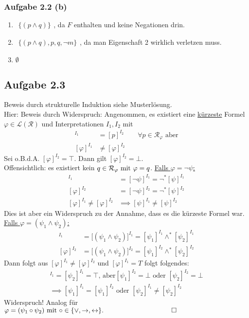 \subsubsection{Aufgabe 2.2 (b)}
\begin{enumerate}[label=(\arabic*)]
	\item $\begin{aligned}\big\lbrace
		(p\wedge q)
	\big\rbrace\end{aligned}$, da $F$ enthalten und keine Negationen drin.
	\item $\begin{aligned}\big\lbrace
		(p\wedge q), p, q, \neg m
	\big\rbrace\end{aligned}$, da man Eigenschaft 2 wirklich verletzen muss.
	\item $\emptyset$
\end{enumerate}

\subsection{Aufgabe 2.3}
Beweis durch strukturelle Induktion siehe Musterlösung.\\
Hier: Beweis durch Widerspruch: Angenommen, es existiert eine \underline{kürzeste} Formel 
$\varphi\in\mathcal{L}(\mathcal{R})$ und Interpretationen $I_1,I_2$ mit 
\begin{align*}
	[p]^{I_1}&=[p]^{I_2}\qquad\forall p\in\mathcal{R}_\varphi\text{ aber}\\
	[\varphi]^{I_1}&\neq[\varphi]^{I_2}
\end{align*}
Sei o.B.d.A. $[\varphi]^{I_2}=\top$. 
Dann gilt $[\varphi]^{I_2}=\bot$.\\
Offensichtlich: es existiert kein $q\in\mathcal{R}_\varphi\mit\varphi=q$.\nl
\underline{Falls $\varphi=\neg\psi$:}
\begin{align*}
	[\varphi]^{I_1}&=[\neg\psi]^{I_1}=\neg^\ast[\psi]^{I_1}\\
	[\varphi]^{I_2}&=[\neg\psi]^{I_2}=\neg^\ast[\psi]^{I_2}\\
	[\varphi]^{I_1}\neq[\varphi]^{I_2}&\implies[\psi]^{I_1}\neq[\psi]^{I_2}
\end{align*}
Dies ist aber ein Widerspruch zu der Annahme, dass es die kürzeste Formel war.\nl
\underline{Falls $\varphi=(\psi_1\wedge\psi_2)$:}
\begin{align*}
	[\varphi]^{I_1}&=\big[(\psi_1\wedge\psi_2)\big]^{I_1}=[\psi_1]^{I_1}\wedge^\ast[\psi_2]^{I_1}\\
	[\varphi]^{I_2}&=\big[(\psi_1\wedge\psi_2)\big]^{I_2}=[\psi_1]^{I_2}\wedge^\ast[\psi_2]^{I_2}
\end{align*}
Dann folgt aus $[\varphi]^{I_1}\neq[\varphi]^{I_2}$ und $[\varphi]^{I_1}=T$ folgt folgendes:
\begin{align*}
	[\psi_1]^{I_1}=[\psi_2]^{I_1}=\top\text{, aber} [\psi_1]^{I_2}=\bot\text{ oder }[\psi_2]^{I_2}=\bot\\
	\implies
	[\psi_1]^{I_1}=[\psi_1]^{I_2}\text{ oder }[\psi_2]^{I_1}\neq[\psi_2]^{I_2}
\end{align*}
Widerspruch!\nl
Analog für $\varphi=(\psi_1\circ\psi_2)\mit\circ\in\lbrace\vee,\to,\leftrightarrow\rbrace.\qquad\qquad\qquad\qquad\qquad\square$

